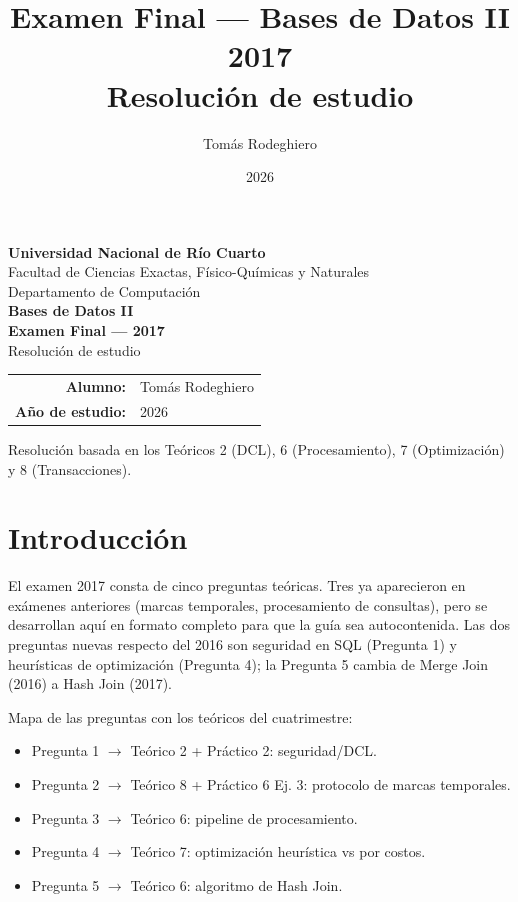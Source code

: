 \documentclass[11pt,a4paper]{article}
\title{Examen Final --- Bases de Datos II\\[4pt]
       \large 2017\\[4pt]
       \large Resolución de estudio}
\author{Tomás Rodeghiero}
\date{2026}
\begin{document}
\begin{titlepage}
    \centering
    \vspace*{1.5cm}

    {\large \textbf{Universidad Nacional de Río Cuarto}}\\[6pt]
    {\normalsize Facultad de Ciencias Exactas, Físico-Químicas y Naturales}\\[4pt]
    {\normalsize Departamento de Computación}\\[3cm]

    {\Large \textbf{Bases de Datos II}}\\[1.2cm]

    {\Large \textbf{Examen Final --- 2017}}\\[6pt]
    {\large Resolución de estudio}\\[3cm]

    \begin{tabular}{rl}
        \textbf{Alumno:} & Tomás Rodeghiero \\[4pt]
        \textbf{Año de estudio:} & 2026 \\
    \end{tabular}

    \vfill
    {\small Resolución basada en los Teóricos 2 (DCL), 6 (Procesamiento), 7 (Optimización) y 8 (Transacciones).}
\end{titlepage}

\tableofcontents
\newpage

\section{Introducción}

El examen 2017 consta de cinco preguntas teóricas. Tres ya aparecieron en exámenes anteriores (marcas temporales, procesamiento de consultas), pero se desarrollan aquí en formato completo para que la guía sea autocontenida. Las dos preguntas nuevas respecto del 2016 son seguridad en SQL (Pregunta 1) y heurísticas de optimización (Pregunta 4); la Pregunta 5 cambia de Merge Join (2016) a Hash Join (2017).

Mapa de las preguntas con los teóricos del cuatrimestre:

\begin{itemize}
    \item Pregunta 1 $\to$ Teórico 2 + Práctico 2: seguridad/DCL.
    \item Pregunta 2 $\to$ Teórico 8 + Práctico 6 Ej. 3: protocolo de marcas temporales.
    \item Pregunta 3 $\to$ Teórico 6: pipeline de procesamiento.
    \item Pregunta 4 $\to$ Teórico 7: optimización heurística vs por costos.
    \item Pregunta 5 $\to$ Teórico 6: algoritmo de Hash Join.
\end{itemize}
\end{document}
